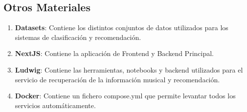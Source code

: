 \subsection{Otros Materiales}

\begin{enumerate}
    \item \textbf{Datasets}: Contiene los distintos conjuntos de datos utilizados para los sistemas de clasificación y recomendación.
    \item \textbf{NextJS}: Contiene la aplicación de Frontend y Backend Principal.
    \item \textbf{Ludwig}: Contiene las herramientas, notebooks y backend utilizados para el servicio de recuperación de la información musical y recomendación.
    \item \textbf{Docker}: Contiene un fichero compose.yml que permite levantar todos los servicios automáticamente.
\end{enumerate}